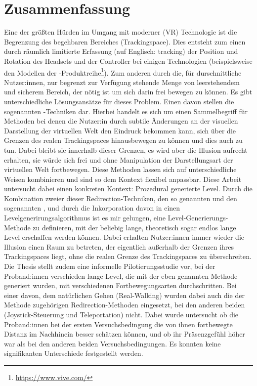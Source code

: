 \chapter*{Zusammenfassung}
Eine der größten Hürden im Umgang mit moderner  (VR) Technologie ist die Begrenzung des begehbaren Bereiches (Trackingspace).
Dies entsteht zum einen durch räumlich limitierte Erfassung (auf Englisch: tracking) der Position und Rotation des Headsets und der Controller bei einigen Technologien (beispielsweise den Modellen der -Produktreihe\footnote{\href{https://www.vive.com/}{https://www.vive.com/}}).
Zum anderen durch die, für durschnittliche Nutzer:innen, nur begrenzt zur Verfügung stehende Menge von leerstehendem und sicherem Bereich, der nötig ist um sich darin frei bewegen zu können.
Es gibt unterschiedliche Lösungsansätze für dieses Problem.
Einen davon stellen die sogenannten -Techniken dar.
Hierbei handelt es sich um einen Sammelbegriff für Methoden bei denen die Nutzer:in durch subtile Änderungen an der visuellen Darstellung der virtuellen Welt den Eindruck bekommen kann, sich über die Grenzen des realen Trackingspaces hinausbewegen zu können und dies auch zu tun. Dabei bleibt sie innerhalb dieser Grenzen, es wird aber die Illusion aufrecht erhalten, sie würde sich frei und ohne Manipulation der Darstellungsart der virtuellen Welt fortbewegen. Diese Methoden lassen sich auf unterschiedliche Weisen kombinieren und sind so dem Kontext flexibel anpassbar.
Diese Arbeit untersucht dabei einen konkreten Kontext: Prozedural generierte Level. Durch die Kombination zweier dieser Redirection-Techniken, den so genannten  und den sogenannten , und durch die Inkorporation davon in einen Levelgenerirungsalgorithmus ist es mir gelungen, eine Level-Generierungs-Methode zu definieren, mit der beliebig lange, theoretisch sogar endlos lange Level erschaffen werden können. Dabei erhalten Nutzer:innen immer wieder die Illusion einen Raum zu betreten, der eigentlich außerhalb der Grenzen ihres Trackingspaces liegt, ohne die realen Grenze des Trackingspaces zu überschreiten.
Die Thesis stellt zudem eine informelle Pilotierungsstudie vor, bei der Proband:innen verschieden lange Level, die mit der eben genannten Methode generiert wurden, mit verschiedenen Fortbewegungsarten durchschritten. Bei einer davon, dem natürlichen Gehen (Real-Walking) wurden dabei auch die der Methode zugehörigen Redirection-Methoden eingesetzt, bei den anderen beiden (Joystick-Steuerung und Teleportation) nicht. Dabei wurde untersucht ob die Proband:innen bei der ersten Versuchsbedingung die von ihnen fortbewegte Distanz im Nachhinein besser schätzen können, und ob ihr Präsenzgefühl höher war als bei den anderen beiden Versuchsbedingungen. Es konnten keine signifikanten Unterschiede festgestellt werden.

